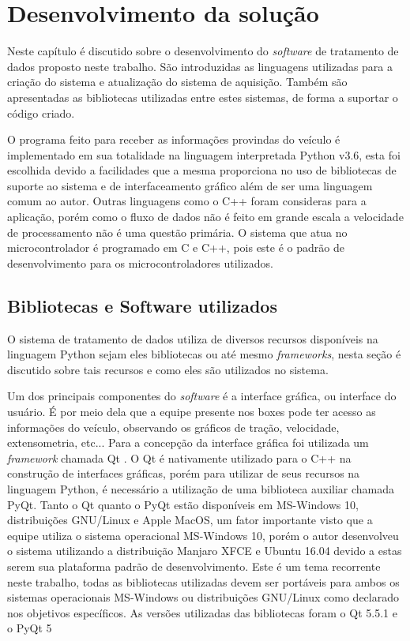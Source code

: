 \chapter{Desenvolvimento da solução}
	\label{ch:desenvolvimento}
Neste capítulo é discutido sobre o desenvolvimento do \textit{software} de tratamento de dados proposto neste trabalho. São introduzidas as linguagens utilizadas para a criação do sistema e atualização do sistema de aquisição. Também são apresentadas as bibliotecas utilizadas entre estes sistemas, de forma a suportar o código criado.

O programa feito para receber as informações provindas do veículo é implementado em sua totalidade na linguagem interpretada Python v3.6, esta foi escolhida devido a facilidades que a mesma proporciona no uso de bibliotecas de suporte ao sistema e de interfaceamento gráfico além de ser uma linguagem comum ao autor. Outras linguagens como o C++ foram consideras para a aplicação, porém como o fluxo de dados não é feito em grande escala a velocidade de processamento não é uma questão primária. O sistema que atua no microcontrolador é programado em C e C++, pois este é o padrão de desenvolvimento para os microcontroladores utilizados. 

\section{Bibliotecas e Software utilizados}
O sistema de tratamento de dados utiliza de diversos recursos disponíveis na linguagem Python sejam eles bibliotecas ou até mesmo \textit{frameworks}, nesta seção é discutido sobre tais recursos e como eles são utilizados no sistema. 

Um dos principais componentes do \textit{software} é a interface gráfica, ou interface do usuário. É por meio dela que a equipe presente nos boxes pode ter acesso as informações do veículo, observando os gráficos de tração, velocidade, extensometria, etc... Para a concepção da interface gráfica foi utilizada um \textit{framework} chamada Qt \cite{qt}. O Qt é nativamente utilizado para o C++ na construção de interfaces gráficas, porém para utilizar de seus recursos na linguagem Python, é necessário a utilização de uma biblioteca auxiliar chamada PyQt\cite{pyqt}. Tanto o Qt quanto o PyQt estão disponíveis em MS-Windows 10, distribuições GNU/Linux e Apple MacOS, um fator importante visto que a equipe utiliza o sistema operacional MS-Windows 10, porém o autor desenvolveu o sistema utilizando a distribuição Manjaro XFCE e Ubuntu 16.04 devido a estas serem sua plataforma padrão de desenvolvimento. Este é um tema recorrente neste trabalho, todas as bibliotecas utilizadas devem ser portáveis para ambos os sistemas operacionais MS-Windows ou distribuições GNU/Linux como declarado nos objetivos específicos. As versões utilizadas das bibliotecas foram o Qt 5.5.1 e o PyQt 5

